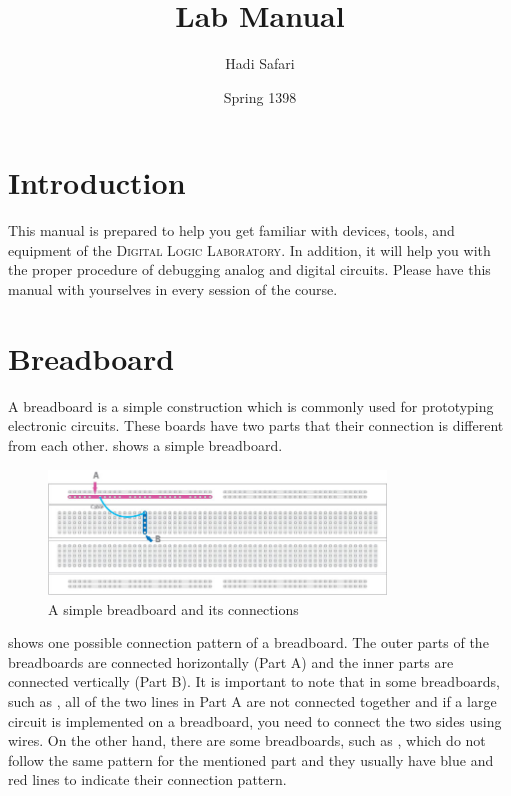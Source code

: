 \documentclass[12pt, logo=tehranDLDL/ut]{tehranDLDL}
\title{Lab Manual}
\author{Hadi Safari}
\date{Spring 1398}
\begin{document}
\maketitle

\tableofcontents
\newpage

\section*{Introduction}

This manual is prepared to help you get familiar with devices, tools, and equipment of the \textsc{Digital Logic Laboratory}. In addition, it will help you with the proper procedure of debugging analog and digital circuits. Please have this manual with yourselves in every session of the course.

\section{Breadboard}

A breadboard is a simple construction which is commonly used for prototyping electronic circuits. These boards have two parts that their connection is different from each other.  shows a simple breadboard.

\begin{figure}[b]
    \centering
    \caption{A simple breadboard and its connections\label{fig:breadboard}}
    \includegraphics[width=0.8\textwidth]{breadboard.jpg}
\end{figure}

 shows one possible connection pattern of a breadboard. The outer parts of the breadboards are connected horizontally (Part A) and the inner parts are connected vertically (Part B). It is important to note that in some breadboards, such as , all of the two lines in Part A are not connected together and if a large circuit is implemented on a breadboard, you need to connect the two sides using wires. On the other hand, there are some breadboards, such as , which do not follow the same pattern for the mentioned part and they usually have blue and red lines to indicate their connection pattern.
\end{document}
